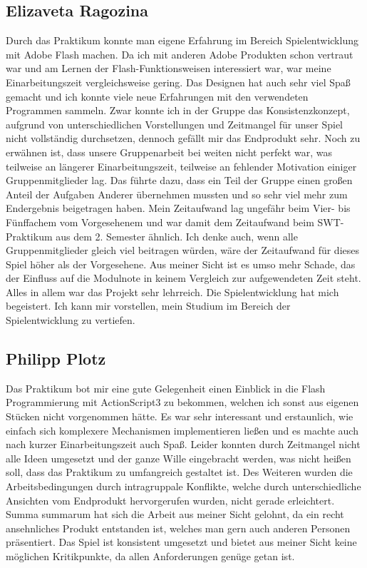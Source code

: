 \documentclass[a4paper, 11pt]{article} %
\begin{document}
\subsection{Elizaveta Ragozina}
Durch das Praktikum konnte man eigene Erfahrung im Bereich Spielentwicklung mit Adobe Flash machen. Da ich mit anderen Adobe Produkten schon vertraut war und am Lernen der Flash-Funktionsweisen interessiert war, war meine Einarbeitungszeit vergleichsweise gering. Das Designen hat auch sehr viel Spaß gemacht und ich konnte viele neue Erfahrungen mit den verwendeten Programmen sammeln. Zwar konnte ich in der Gruppe das Konsistenzkonzept, aufgrund von unterschiedlichen Vorstellungen und Zeitmangel für unser Spiel nicht vollständig durchsetzen, dennoch gefällt mir das Endprodukt sehr.
Noch zu erwähnen ist, dass unsere Gruppenarbeit bei weiten nicht perfekt war, was teilweise an längerer Einarbeitungszeit, teilweise an fehlender Motivation einiger Gruppenmitglieder lag. Das führte dazu, dass ein Teil der Gruppe einen großen Anteil der Aufgaben Anderer übernehmen mussten und so sehr viel mehr zum Endergebnis beigetragen haben. Mein Zeitaufwand lag ungefähr beim Vier- bis Fünffachem vom Vorgesehenem und war damit dem Zeitaufwand beim SWT-Praktikum aus dem 2. Semester ähnlich. Ich denke auch, wenn alle Gruppenmitglieder gleich viel beitragen würden, wäre der Zeitaufwand für dieses Spiel höher als der Vorgesehene. Aus meiner Sicht ist es umso mehr Schade, das der Einfluss auf die Modulnote in keinem Vergleich zur aufgewendeten Zeit steht. \\
Alles in allem war das Projekt sehr lehrreich. Die Spielentwicklung hat mich begeistert. Ich kann mir vorstellen, mein Studium im Bereich der Spielentwicklung zu vertiefen.

\subsection{Philipp Plotz}
Das Praktikum bot mir eine gute Gelegenheit einen Einblick in die Flash Programmierung mit ActionScript3 zu bekommen, welchen ich sonst aus eigenen Stücken nicht vorgenommen hätte. Es war sehr interessant und erstaunlich, wie einfach sich komplexere Mechanismen implementieren ließen und es machte auch nach kurzer Einarbeitungszeit auch Spaß. Leider konnten durch Zeitmangel nicht alle Ideen umgesetzt und der ganze Wille eingebracht werden, was nicht heißen soll, dass das Praktikum zu umfangreich gestaltet ist. Des Weiteren wurden die Arbeitsbedingungen durch intragruppale Konflikte, welche durch unterschiedliche Ansichten vom Endprodukt hervorgerufen wurden, nicht gerade erleichtert. Summa summarum hat sich die Arbeit aus meiner Sicht gelohnt, da ein recht ansehnliches Produkt entstanden ist, welches man gern auch anderen Personen präsentiert. Das Spiel ist konsistent umgesetzt und bietet aus meiner Sicht keine möglichen Kritikpunkte, da allen Anforderungen genüge getan ist.
\end{document}
